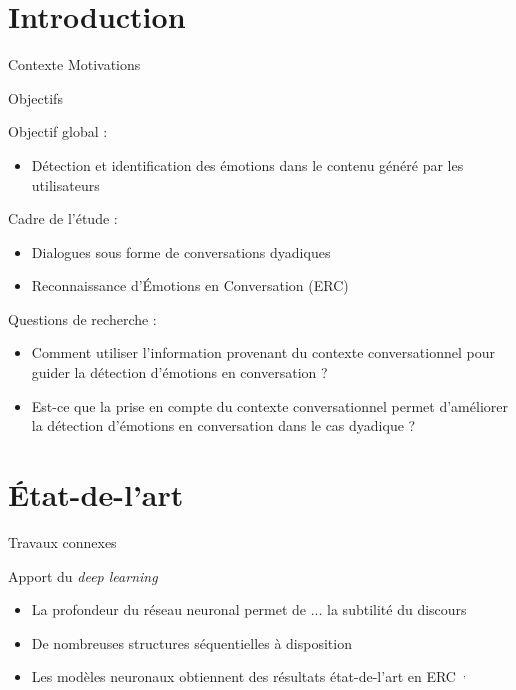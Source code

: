 \documentclass[11pt,aspectratio=169]{beamer}
\begin{document}
\section{Introduction}

\begin{frame}{Contexte}
    Motivations
\end{frame}

\begin{frame}{Objectifs}
    
    Objectif global :
    \begin{itemize}
        \item Détection et identification des émotions dans le contenu généré par les utilisateurs
    \end{itemize}
    \vspace{10pt}
    Cadre de l'étude : %
    \begin{itemize}
        \item Dialogues sous forme de conversations dyadiques %
        \item Reconnaissance d'Émotions en Conversation (ERC) %
    \end{itemize}
    \vspace{10pt}
    Questions de recherche :
    \begin{itemize}
        \item Comment utiliser l'information provenant du contexte conversationnel pour guider la détection d'émotions en conversation ?
        \item Est-ce que la prise en compte du contexte conversationnel permet d'améliorer la détection d'émotions en conversation dans le cas dyadique ?
    \end{itemize}
\end{frame}

\section{État-de-l'art}

\begin{frame}{Travaux connexes}
    
\end{frame}

\begin{frame}{Apport du \textsl{deep learning}}
    \begin{itemize}
        \item La profondeur du réseau neuronal permet de ... la subtilité du discours
        \item De nombreuses structures séquentielles à disposition
        \item Les modèles neuronaux obtiennent des résultats état-de-l'art en ERC~$^{,}$
    \end{itemize}
\end{frame}
\end{document}
